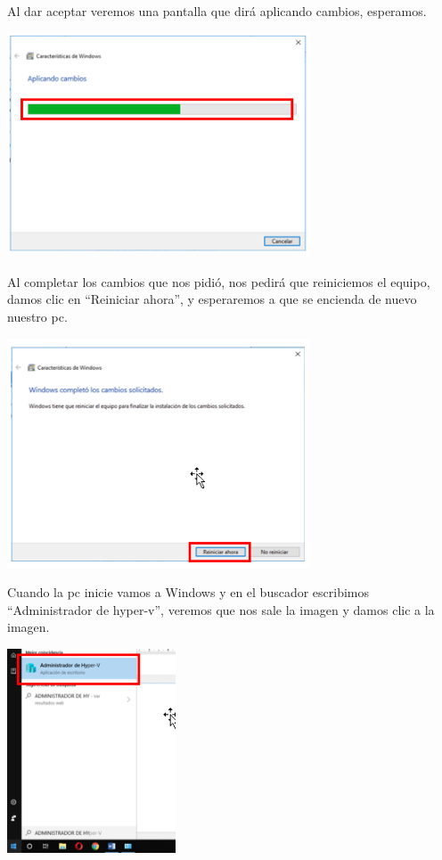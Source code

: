 \vspace{\baselineskip}

 Al dar aceptar veremos una pantalla que dirá aplicando cambios, esperamos.
     \begin{center}
 	\includegraphics[width=9cm]{./Imagenes/6} 
 	\end{center}
 
 \vspace{\baselineskip}
 
 Al completar los cambios que nos pidió, nos pedirá que reiniciemos el equipo, damos clic en “Reiniciar ahora”, y esperaremos a que se encienda de nuevo nuestro pc.
    \begin{center}
 	\includegraphics[width=9cm]{./Imagenes/7} 
    \end{center}

Cuando la pc inicie vamos a Windows y en el buscador escribimos “Administrador de hyper-v”, veremos que nos sale la imagen y damos clic a la imagen. 
\begin{center}
	\includegraphics[width=5cm]{./Imagenes/8} 
\end{center}

